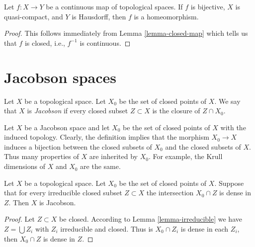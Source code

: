 \begin{lemma}
\label{lemma-bijective-map}
Let $f : X \to Y$ be a continuous map of topological spaces.
If $f$ is bijective, $X$ is quasi-compact, and $Y$ is Hausdorff,
then $f$ is a homeomorphism.
\end{lemma}

\begin{proof}
This follows immediately from Lemma \ref{lemma-closed-map}
which tells us that $f$ is closed, i.e., $f^{-1}$ is
continuous.
\end{proof}













\section{Jacobson spaces}
\label{section-space-jacobson}

\begin{definition}
\label{definition-space-jacobson}
Let $X$ be a topological space.
Let $X_0$ be the set of closed points of $X$.
We say that $X$ is {\it Jacobson} if every
closed subset $Z \subset X$ is the closure
of $Z \cap X_0$.
\end{definition}

\noindent
Let $X$ be a Jacobson space and let $X_0$ be the set
of closed points of $X$ with the induced topology.
Clearly, the definition implies that the morphism
$X_0 \to X$ induces a bijection between the closed
subsets of $X_0$ and the closed subsets of $X$.
Thus many properties of $X$ are inherited by $X_0$.
For example, the Krull dimensions of $X$ and $X_0$
are the same.

\begin{lemma}
\label{lemma-jacobson-check-irreducible-closed}
Let $X$ be a topological space. Let $X_0$ be the set
of closed points of $X$.
Suppose that for every irreducible closed subset $Z \subset X$
the intersection $X_0 \cap Z$ is dense in $Z$.
Then $X$ is Jacobson.
\end{lemma}

\begin{proof}
Let $Z \subset X$ be closed. According to Lemma \ref{lemma-irreducible}
we have $Z = \bigcup Z_i$ with $Z_i$ irreducible and closed.
Thus is $X_0 \cap Z_i$ is dense in each $Z_i$, then $X_0 \cap Z$
is dense in $Z$.
\end{proof}

